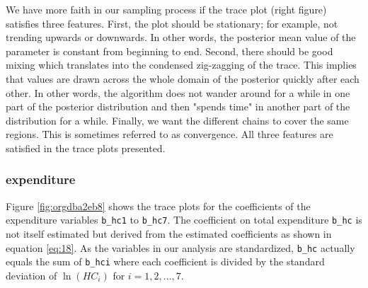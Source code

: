 \documentclass[12pt,english,a4paper]{article}
\begin{document}
We have more faith in our sampling process if the trace plot (right figure) satisfies three features. First, the plot should be stationary; for example, not trending upwards or downwards. In other words, the posterior mean value of the parameter is constant from beginning to end. Second, there should be good mixing which translates into the condensed zig-zagging of the trace. This implies that values are drawn across the whole domain of the posterior quickly after each other. In other words, the algorithm does not wander around for a while in one part of the posterior distribution and then "spends time" in another part of the distribution for a while. Finally, we want the different chains to cover the same regions. This is sometimes referred to as convergence. All three features are satisfied in the trace plots presented.


\subsubsection{expenditure}
\label{sec:orgf0f9698}
\label{app:expenditure}

Figure \ref{fig:orgdba2eb8} shows the trace plots for the coefficients of the expenditure variables \texttt{b\_hc1} to \texttt{b\_hc7}. The coefficient on total expenditure \texttt{b\_hc} is not itself estimated but derived from the estimated coefficients as shown in equation \eqref{eq:18}. As the variables in our analysis are standardized, \texttt{b\_hc} actually equals the sum of \texttt{b\_hci} where each coefficient is divided by the standard deviation of \(\ln(HC_i)\) for \(i=1,2,...,7\).
\end{document}
